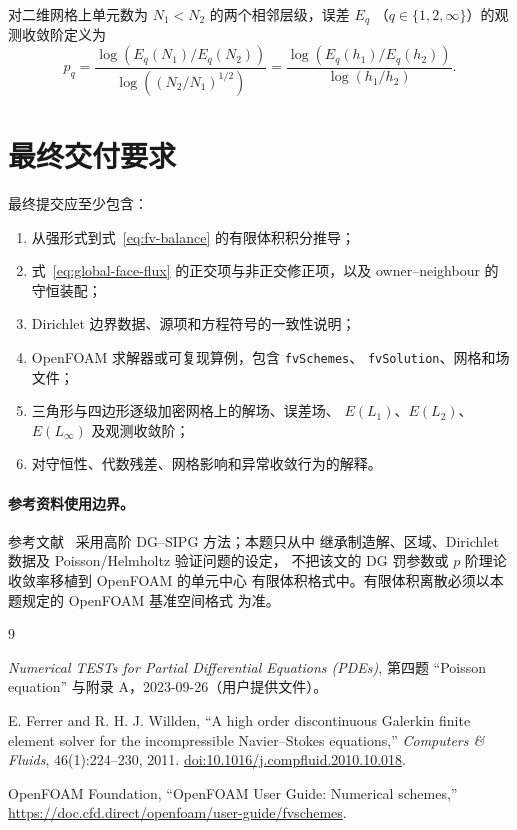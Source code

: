 \documentclass[11pt,a4paper]{ctexart}
\begin{document}
对二维网格上单元数为 $N_1<N_2$ 的两个相邻层级，误差 $E_q$
（$q\in\{1,2,\infty\}$）的观测收敛阶定义为
\begin{equation}
  p_q
  =\frac{\log\!\left(E_q(N_1)/E_q(N_2)\right)}
  {\log\!\left((N_2/N_1)^{1/2}\right)}
  =\frac{\log\!\left(E_q(h_1)/E_q(h_2)\right)}
  {\log(h_1/h_2)}.
  \label{eq:order}
\end{equation}

\section{最终交付要求}

最终提交应至少包含：
\begin{enumerate}[label=(\arabic*)]
  \item 从强形式到式~\eqref{eq:fv-balance} 的有限体积积分推导；
  \item 式~\eqref{eq:global-face-flux} 的正交项与非正交修正项，以及
  owner--neighbour 的守恒装配；
  \item Dirichlet 边界数据、源项和方程符号的一致性说明；
  \item OpenFOAM 求解器或可复现算例，包含 \texttt{fvSchemes}、
  \texttt{fvSolution}、网格和场文件；
  \item 三角形与四边形逐级加密网格上的解场、误差场、
  $E(L_1)$、$E(L_2)$、$E(L_\infty)$ 及观测收敛阶；
  \item 对守恒性、代数残差、网格影响和异常收敛行为的解释。
\end{enumerate}

\paragraph{参考资料使用边界。}
参考文献~\cite{FerrerWillden2011} 采用高阶 DG--SIPG 方法；本题只从中
继承制造解、区域、Dirichlet 数据及 Poisson/Helmholtz 验证问题的设定，
不把该文的 DG 罚参数或 $p$ 阶理论收敛率移植到 OpenFOAM 的单元中心
有限体积格式中。有限体积离散必须以本题规定的 OpenFOAM 基准空间格式
为准。

\begin{thebibliography}{9}

\emph{Numerical TESTs for Partial Differential Equations (PDEs)},
第四题 ``Poisson equation'' 与附录 A，2023-09-26（用户提供文件）。

E. Ferrer and R. H. J. Willden,
``A high order discontinuous Galerkin finite element solver for the
incompressible Navier--Stokes equations,''
\emph{Computers \& Fluids}, 46(1):224--230, 2011.
\href{https://doi.org/10.1016/j.compfluid.2010.10.018}
{doi:10.1016/j.compfluid.2010.10.018}.

OpenFOAM Foundation,
``OpenFOAM User Guide: Numerical schemes,''
\url{https://doc.cfd.direct/openfoam/user-guide/fvschemes}.

\end{thebibliography}
\end{document}
